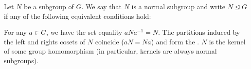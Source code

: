\begin{definition}\label{def:normal_subgroup}
  Let \( N \) be a subgroup of \( G \). We say that \( N \) is a normal subgroup and write \( N \unlhd G \) if any of the following equivalent conditions hold:
  \begin{defenum}
     For any \( a \in G \), we have the set equality \( a N a^{-1} = N \).
     The partitions induced by the left and rights cosets of \( N \) coincide (\( aN = Na \)) and form the .
     \( N \) is the kernel of some group homomorphism (in particular, kernels are always normal subgroups).
  \end{defenum}
\end{definition}
